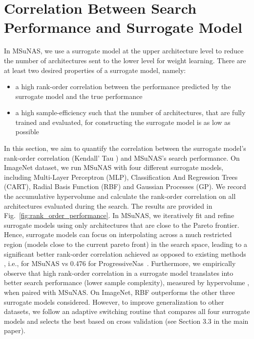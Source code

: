 \documentclass[runningheads]{llncs}
\def\ourmethod{MSuNAS}
\begin{document}
\section{Correlation Between Search Performance and Surrogate Model\label{sec:surrogate}}
In \ourmethod{}, we use a surrogate model at the upper architecture level to reduce the number of architectures sent to the lower level for weight learning. There are at least two desired properties of a surrogate model, namely:

\begin{itemize}
    \item a high rank-order correlation between the performance predicted by the surrogate model and the true performance
    \item a high sample-efficiency such that the number of architectures, that are fully trained and evaluated, for constructing the surrogate model is as low as possible
\end{itemize}

In this section, we aim to quantify the correlation between the surrogate model's rank-order correlation (Kendall' Tau \cite{kendalltau}) and \ourmethod{}'s search performance. On ImageNet dataset, we run \ourmethod{} with four different surrogate models, including Multi-Layer Perceptron (MLP), Classification And Regression Trees (CART), Radial Basis Function (RBF) and Gaussian Processes (GP). We record the accumulative hypervolume \cite{hypervolume} and calculate the rank-order correlation on all architectures evaluated during the search. The results are provided in Fig.~\ref{fig:rank_order_performance}. In \ourmethod{}, we iteratively fit and refine surrogate models using only architectures that are close to the Pareto frontier. Hence, surrogate models can focus on interpolating across a much restricted region (models close to the current pareto front) in the search space, leading to a significant better rank-order correlation achieved as opposed to existing methods \cite{PNAS,dppnet}, i.e.,  for \ourmethod{} vs 0.476 for ProgressiveNas~\cite{PNAS}. Furthermore, we empirically observe that high rank-order correlation in a surrogate model translates into better search performance (lower sample complexity), measured by hypervolume \cite{hypervolume}, when paired with \ourmethod{}. On ImageNet, RBF outperforms the other three  surrogate models considered. However, to improve generalization to other datasets, we follow an adaptive switching routine that compares all four surrogate models and selects the best based on cross validation (see Section 3.3 in the main paper).
\end{document}
